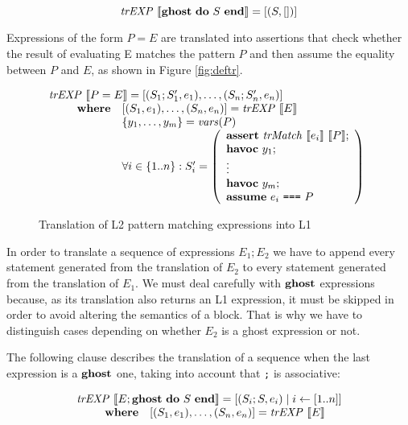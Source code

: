 \[
\mathit{trEXP}~\llbracket\textbf{ghost}~\textbf{do}~S~\textbf{end}\rrbracket = [(S, [])]
\]

Expressions of the form $P = E$ are translated into assertions that check
whether the result of evaluating E matches the pattern $P$ and then assume the
equality between $P$ and $E$, as shown in Figure \ref{fig:deftr}.

\begin{figure}
\[
\begin{array}{l}
\mathit{trEXP}~\llbracket P = E\rrbracket = [(S_1;S_1',e_1), \dots, (S_n;S_n', e_n)] \\
\qquad 
\begin{array}{ll}
\textbf{where} & [(S_1,e_1),\dots,(S_n, e_n)] = \mathit{trEXP}~\llbracket E\rrbracket \\
& \{y_1, \ldots, y_m\} = \mathit{vars}(P) \\
& \forall i \in \{1..n\}: S_i' = \left(
\begin{array}{l}
\textbf{assert}~\mathit{trMatch}~\llbracket e_i\rrbracket~\llbracket P\rrbracket;\\
\textbf{havoc}~y_1;\\
\vdots\\
\textbf{havoc}~y_m;\\
\textbf{assume}~e_i ~\texttt{===}~ P\\
\end{array}
\right)
\end{array}
\end{array}
\]
\caption{Translation of L2 pattern matching expressions into L1}
\label{fig:pattr}
\end{figure}

In order to translate a sequence of expressions $E_1;E_2$ we have to append 
every statement generated from the translation of $E_2$ to every statement 
generated from the translation of $E_1$. We must deal carefully with $\textbf{ghost}$
expressions because, as its translation also returns an L1 expression, it must
be skipped in order to avoid altering the semantics of a block. That is why we 
have to distinguish cases depending on whether $E_2$ is a ghost expression or
not.

The following clause describes the translation of a sequence when the last
expression is a $\textbf{ghost}$ one, taking into account that \verb|;| is associative:

\[
\begin{array}{l}
\mathit{trEXP}~\llbracket E;\textbf{ghost}~\textbf{do}~S~\textbf{end}\rrbracket = [(S_i;S,e_i) \mid i \leftarrow [1..n]] \\
\qquad 
\begin{array}{ll}
\textbf{where} & [(S_1,e_1),\dots,(S_n, e_n)] = \mathit{trEXP}~\llbracket E\rrbracket \\
\end{array}
\end{array}
\]

